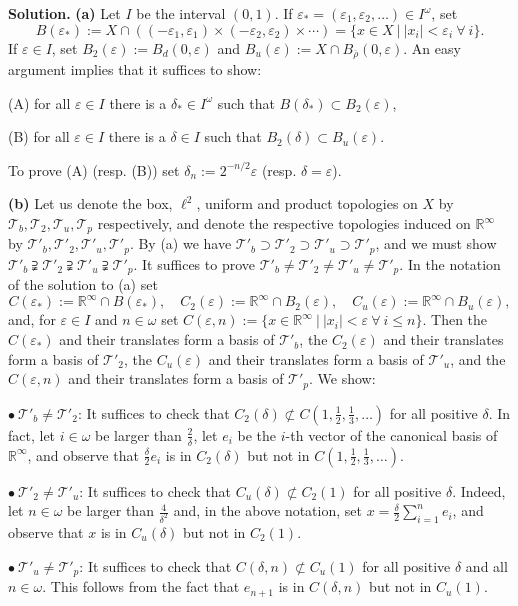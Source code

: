 \documentclass[12pt,letterpaper]{article}
\newcommand{\eps}{\varepsilon}
\newcommand{\noi}{\noindent}%
\newcommand{\R}{\mathbb R}
\newcommand{\T}{\mathcal T}
\begin{document}
\noi\textbf{Solution.} \textbf{(a)} Let $I$ be the interval $(0,1)$. If $\eps_*=(\eps_1,\eps_2,\ldots)\in I^\omega$, set 
$$
B(\eps_*):=X\cap((-\eps_1,\eps_1)\times(-\eps_2,\eps_2)\times\cdots)=\{x\in X\ |\ |x_i|<\eps_i\ \forall\ i\}.
$$ 
If $\eps\in I$, set $B_2(\eps):=B_d(0,\eps)$ and $B_u(\eps):=X\cap B_{\overline\rho}(0,\eps)$. An easy argument implies that it suffices to show: 

(A) for all $\eps\in I$ there is a $\delta_*\in I^\omega$ such that $B(\delta_*)\subset B_2(\eps)$, 

(B) for all $\eps\in I$ there is a $\delta\in I$ such that $B_2(\delta)\subset B_u(\eps)$. 

\noi To prove (A) (resp. (B)) set $\delta_n:=2^{-n/2}\eps$ (resp. $\delta=\eps$). 

\noi\textbf{(b)} Let us denote the box, $\ell^2$, uniform and product topologies on $X$ by $\T_b,\T_2,\T_u,\T_p$ respectively, and denote the respective topologies induced on $\R^\infty$ by $\T'_b,\T'_2,\T'_u,\T'_p$. By (a) we have $\T'_b\supset\T'_2\supset\T'_u\supset\T'_p$, and we must show $\T'_b\supsetneqq\T'_2\supsetneqq\T'_u\supsetneqq\T'_p$. It suffices to prove $\T'_b\ne\T'_2\ne\T'_u\ne\T'_p$. In the notation of the solution to (a) set 
$$
C(\eps_*):=\R^\infty\cap B(\eps_*),\quad C_2(\eps):=\R^\infty\cap B_2(\eps),\quad C_u(\eps):=\R^\infty\cap B_u(\eps),
$$ 
and, for $\eps\in I$ and $n\in\omega$ set $C(\eps,n):=\{x\in\R^\infty\ |\ |x_i|<\eps\ \forall\ i\le n\}$. Then the $C(\eps_*)$ and their translates form a basis of $\T'_b$, the $C_2(\eps)$ and their translates form a basis of $\T'_2$, the $C_u(\eps)$ and their translates form a basis of $\T'_u$, and the $C(\eps,n)$ and their translates form a basis of $\T'_p$. We show: 

\noi$\bullet\ \T'_b\ne\T'_2$: It suffices to check that $C_2(\delta)\not\subset C(1,\frac12,\frac13,\ldots)$ for all positive $\delta$. In fact, let $i\in\omega$ be larger than $\frac2\delta$, let $e_i$ be the $i$-th vector of the canonical basis of $\R^\infty$, and observe that $\frac\delta2e_i$ is in $C_2(\delta)$ but not in $C(1,\frac12,\frac13,\ldots)$. 

\noi$\bullet\ \T'_2\ne\T'_u$: It suffices to check that $C_u(\delta)\not\subset C_2(1)$ for all positive $\delta$. Indeed, let $n\in\omega$ be larger than $\frac4{\delta^2}$ and, in the above notation, set $x=\frac\delta2\sum_{i=1}^ne_i$, and observe that $x$ is in $C_u(\delta)$ but not in $C_2(1)$. 

\noi$\bullet\ \T'_u\ne\T'_p$: It suffices to check that $C(\delta,n)\not\subset C_u(1)$ for all positive $\delta$ and all $n\in\omega$. This follows from the fact that $e_{n+1}$ is in $C(\delta,n)$ but not in $C_u(1)$. %
\end{document}
